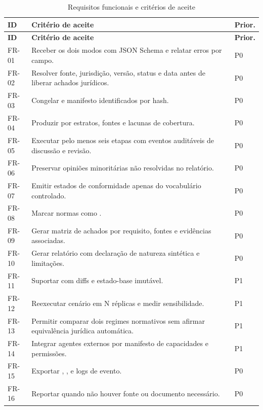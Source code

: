 \documentclass[12pt,a4paper,oneside,english,brazil]{abntex2}
\newcommand{\term}[1]{{\ttfamily\small\seqsplit{#1}}}
\begin{document}
\begin{longtable}{@{}p{}p{}p{}@{}}
\caption{Requisitos funcionais e critérios de aceite}\label{tab:requisitos}\\
\toprule\textbf{ID} & \textbf{Critério de aceite} & \textbf{Prior.}\\\midrule\endfirsthead
\toprule\textbf{ID} & \textbf{Critério de aceite} & \textbf{Prior.}\\\midrule\endhead
FR-01 & Receber os dois modos com JSON Schema e relatar erros por campo. & P0\\
FR-02 & Resolver fonte, jurisdição, versão, status e data antes de liberar achados jurídicos. & P0\\
FR-03 & Congelar \term{WorldSnapshot} e manifesto identificados por hash. & P0\\
FR-04 & Produzir \term{CouncilRoster} por estratos, fontes e lacunas de cobertura. & P0\\
FR-05 & Executar pelo menos seis etapas com eventos auditáveis de discussão e revisão. & P0\\
FR-06 & Preservar opiniões minoritárias não resolvidas no relatório. & P0\\
FR-07 & Emitir estados de conformidade apenas do vocabulário controlado. & P0\\
FR-08 & Marcar normas \term{proposed} como \term{proposalOnly}. & P0\\
FR-09 & Gerar matriz de achados por requisito, fontes e evidências associadas. & P0\\
FR-10 & Gerar relatório com declaração de natureza sintética e limitações. & P0\\
FR-11 & Suportar \term{ScenarioBranch} com diffs e estado-base imutável. & P1\\
FR-12 & Reexecutar cenário em N réplicas e medir sensibilidade. & P1\\
FR-13 & Permitir comparar dois regimes normativos sem afirmar equivalência jurídica automática. & P1\\
FR-14 & Integrar agentes externos por manifesto de capacidades e permissões. & P1\\
FR-15 & Exportar \term{json}, \term{md}, \term{pdf} e logs de evento. & P0\\
FR-16 & Reportar \term{unknown} quando não houver fonte ou documento necessário. & P0\\\bottomrule
\end{longtable}
\end{document}
